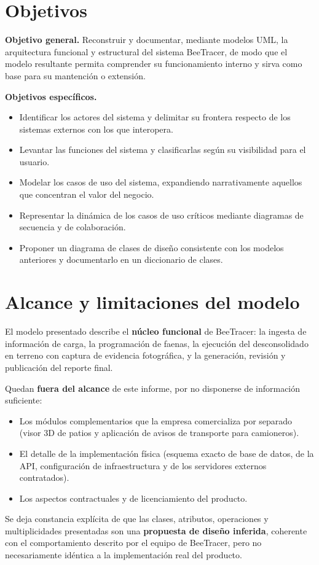 \section{Objetivos}
\label{sec:objetivos}

\textbf{Objetivo general.} Reconstruir y documentar, mediante modelos UML, la arquitectura
funcional y estructural del sistema BeeTracer, de modo que el modelo resultante permita comprender
su funcionamiento interno y sirva como base para su mantención o extensión.

\textbf{Objetivos específicos.}

\begin{itemize}
    \item Identificar los actores del sistema y delimitar su frontera respecto de los sistemas
          externos con los que interopera.
    \item Levantar las funciones del sistema y clasificarlas según su visibilidad para el usuario.
    \item Modelar los casos de uso del sistema, expandiendo narrativamente aquellos que concentran
          el valor del negocio.
    \item Representar la dinámica de los casos de uso críticos mediante diagramas de secuencia y de
          colaboración.
    \item Proponer un diagrama de clases de diseño consistente con los modelos anteriores y
          documentarlo en un diccionario de clases.
\end{itemize}

\section{Alcance y limitaciones del modelo}
\label{sec:alcance}

El modelo presentado describe el \textbf{núcleo funcional} de BeeTracer: la ingesta de información
de carga, la programación de faenas, la ejecución del desconsolidado en terreno con captura de
evidencia fotográfica, y la generación, revisión y publicación del reporte final.

Quedan \textbf{fuera del alcance} de este informe, por no disponerse de información suficiente:

\begin{itemize}
    \item Los módulos complementarios que la empresa comercializa por separado (visor 3D de patios
          y aplicación de avisos de transporte para camioneros).
    \item El detalle de la implementación física (esquema exacto de base de datos, 
          de la API, configuración de infraestructura y de los servidores externos contratados).
    \item Los aspectos contractuales y de licenciamiento del producto.
\end{itemize}

Se deja constancia explícita de que las clases, atributos, operaciones y multiplicidades
presentadas son una \textbf{propuesta de diseño inferida}, coherente con el comportamiento descrito
por el equipo de BeeTracer, pero no necesariamente idéntica a la implementación real del producto.

